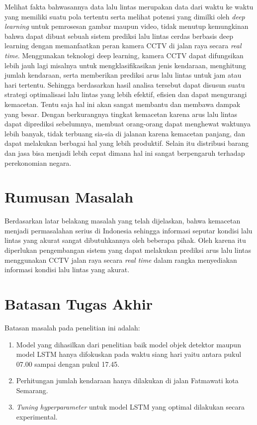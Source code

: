 \documentclass[../thesis.tex]{subfiles}
\begin{document}
Melihat fakta bahwasannya data lalu lintas merupakan data dari waktu ke waktu yang memiliki suatu pola tertentu serta melihat potensi yang dimilki oleh \textit{deep learning} untuk pemrosesan gambar maupun video, tidak menutup kemungkinan bahwa dapat dibuat sebuah sistem prediksi lalu lintas cerdas berbasis deep learning dengan memanfaatkan peran kamera CCTV di jalan raya secara \textit{real time}. 
Menggunakan teknologi deep learning, kamera CCTV dapat difungsikan lebih jauh lagi misalnya untuk mengklasifikasikan jenis kendaraan, menghitung jumlah kendaraan, serta memberikan prediksi arus lalu lintas untuk jam atau hari tertentu. Sehingga berdasarkan hasil analisa tersebut dapat disusun suatu strategi optimalisasi lalu lintas yang lebih efektif, efisien dan dapat mengurangi kemacetan. 
Tentu saja hal ini akan sangat membantu dan membawa dampak yang besar. Dengan berkurangnya tingkat kemacetan karena arus lalu lintas dapat diprediksi sebelumnya, membuat orang-orang dapat menghewat waktunya lebih banyak, tidak terbuang sia-sia di jalanan karena kemacetan panjang, dan dapat melakukan berbagai hal yang lebih produktif. 
Selain itu distribusi barang dan jasa bisa menjadi lebih cepat dimana hal ini sangat berpengaruh terhadap perekonomian negara. 

\section{Rumusan Masalah}
Berdasarkan latar belakang masalah yang telah dijelaskan, bahwa kemacetan menjadi permasalahan serius di Indonesia sehingga informasi seputar kondisi lalu lintas yang akurat sangat dibutuhkannya oleh beberapa pihak. Oleh karena itu diperlukan pengembangan sistem yang dapat melakukan prediksi arus lalu lintas menggunakan CCTV jalan raya secara \textit{real time} dalam rangka menyediakan informasi kondisi lalu lintas yang akurat. 

\section{Batasan Tugas Akhir}
Batasan masalah pada penelitian ini adalah:
\begin{enumerate}
    \item Model yang dihasilkan dari penelitian baik model objek detektor maupun model LSTM hanya difokuskan pada waktu siang hari yaitu antara pukul 07.00 sampai dengan pukul 17.45.
    \item Perhitungan jumlah kendaraan hanya dilakukan di jalan Fatmawati kota Semarang.
    \item \textit{Tuning hyperparameter} untuk model LSTM yang optimal dilakukan secara experimental.
\end{enumerate}
\end{document}
